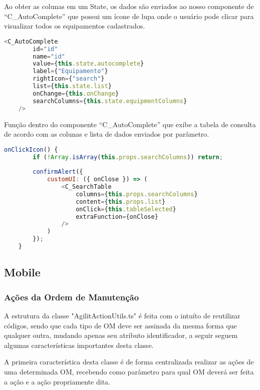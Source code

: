 Ao obter as colunas em um State, os dados são enviados ao nosso componente de ``C{\_}AutoComplete'' que possui um ícone de lupa onde o usuário pode clicar para visualizar todos os equipamentos cadastrados.

\begin{lstlisting}[language=JavaScript, caption={Componente C\_AutoComplete}]
	<C_AutoComplete
		id="id"
		name="id"
		value={this.state.autocomplete}
		label={"Equipamento"}
		rightIcon={"search"}
		list={this.state.list}
		onChange={this.onChange}
		searchColumns={this.state.equipmentColumns}
	/>
\end{lstlisting}

Função dentro do componente ``C{\_}AutoComplete'' que exibe a tabela de consulta de acordo com as colunas e lista de dados enviados por parâmetro.

\begin{lstlisting}[language=JavaScript, caption={Componente C\_AutoComplete}]
	onClickIcon() {
		if (!Array.isArray(this.props.searchColumns)) return;
		
		confirmAlert({
			customUI: ({ onClose }) => (
				<C_SearchTable
					columns={this.props.searchColumns}
					content={this.props.list}
					onClick={this.tableSelected}
					extraFunction={onClose}
				/>
			)
		});
	}
\end{lstlisting}

\subsection{Mobile}
\subsubsection{Ações da Ordem de Manutenção}
A estrutura da classe "AgilitActionUtils.ts" é feita com o intuíto de reutilizar códigos, sendo que  cada tipo de OM deve ser assinada da mesma forma que qualquer outra, mudando apenas seu atributo identificador, a seguir seguem algumas características importantes desta classe.

A primeira característica desta classe é de forma centralizada realizar as ações de uma determinada OM, recebendo como parâmetro para qual OM deverá ser feita a ação e a ação propriamente dita.


